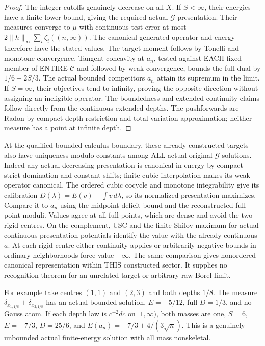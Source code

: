 \documentclass[11pt]{article}
\newcommand{\C}{\mathcal C}
\newcommand{\G}{\mathcal G}
\begin{document}
\begin{proof}
The integer cutoffs genuinely decrease on all $X$. If $S<\infty$, their
energies have a finite lower bound, giving the required actual $\G$
presentation. Their measures converge to $\mu$ with continuous-test
error at most $2\|h\|_\infty\sum_i\zeta_i((n,\infty))$.
The canonical generated operator and energy therefore have the stated
values. The target moment follows by Tonelli and monotone convergence.
Tangent concavity at $a_n$, tested against EACH fixed member of ENTIRE
$\C$ and followed by weak convergence, bounds the full dual by
$1/6+2S/3$. The actual bounded competitors $a_n$ attain its supremum
in the limit. If $S=\infty$, their objectives tend to infinity, proving
the opposite direction without assigning an ineligible operator.
The boundedness and extended-continuity claims follow directly from the
continuous extended depths. The pushforwards are Radon by compact-depth
restriction and total-variation approximation; neither measure has a
point at infinite depth.
\end{proof}

At the qualified bounded-calculus boundary, these already constructed
targets also have uniqueness modulo constants among ALL actual original
$\G$ solutions. Indeed any actual decreasing presentation is canonical
in energy by compact strict domination and constant shifts; finite cubic
interpolation makes its weak operator canonical. The ordered cubic
cocycle and monotone integrability give its calibration
$D(\lambda)=E(v)-\int v\,d\lambda$, so its normalized presentation
maximizes. Compare it to $a_n$ using the midpoint deficit bound and
the reconstructed full-point moduli. Values agree at all full points,
which are dense and avoid the two rigid centres. On the complement,
USC and the finite Shilov maximum for actual continuous presentation
potentials identify the value with the already continuous $a$.
At each rigid centre either continuity applies or arbitrarily negative
bounds in ordinary neighborhoods force value $-\infty$.
The same comparison gives nonordered canonical representation within
THIS constructed sector. It supplies no recognition theorem for an
unrelated target or arbitrary raw Borel limit.

For example take centres $(1,1)$ and $(2,3)$ and both depths $1/8$.
The measure $\delta_{x_{1,1/8}}+\delta_{x_{2,1/8}}$ has an actual bounded
solution, $E=-5/12$, full $D=1/3$, and no Gauss atom.
If each depth law is $c^{-2}dc$ on $[1,\infty)$, both masses are one,
$S=6$, $E=-7/3$, $D=25/6$, and
$E(a_n)=-7/3+4/(3\sqrt n)$. This is a genuinely unbounded actual
finite-energy solution with all mass nonskeletal.
\end{document}
